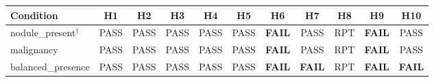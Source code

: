 \begin{tabular}{lcccccccccc}
\toprule
Condition & H1 & H2 & H3 & H4 & H5 & H6 & H7 & H8 & H9 & H10 \\
\midrule
nodule\_present$^\dagger$ & PASS & PASS & PASS & PASS & PASS & \textbf{FAIL} & PASS & RPT & \textbf{FAIL} & PASS \\
malignancy & PASS & PASS & PASS & PASS & PASS & \textbf{FAIL} & PASS & RPT & \textbf{FAIL} & PASS \\
balanced\_presence & PASS & PASS & PASS & PASS & PASS & \textbf{FAIL} & \textbf{FAIL} & RPT & \textbf{FAIL} & \textbf{FAIL} \\
\bottomrule
\end{tabular}
